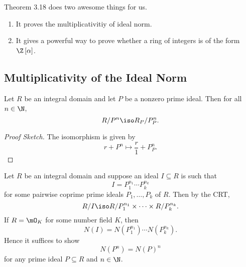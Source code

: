 \documentclass[pmath441]{subfiles}
\begin{document}
    \np Theorem 3.18 does two awesome things for us.
    \begin{enumerate}
        \item It proves the multiplicativitiy of ideal norm.
        \item It gives a powerful way to prove whether a ring of integers is of the form $\Z\left[ \alpha \right]$.
    \end{enumerate}
    
    \subsection{Multiplicativity of the Ideal Norm}
    
    \begin{prop}{}
        Let $R$ be an integral domain and let $P$ be a nonzero prime ideal. Then for all $n\in\N$,
        \begin{equation*}
            R /P^n \iso R_P /P_P^n.
        \end{equation*}
    \end{prop}

    \begin{proof}[Proof Sketch]
        The isomorphism is given by
        \begin{equation*}
            r+P^n \mapsto \frac{r}{1} + P_P^n.
        \end{equation*}
    \end{proof}

    \clearpage
    
    \begin{boxyrecall}{}
        Let $R$ be an integral domain and suppose an ideal $I\subseteq R$ is such that
        \begin{equation*}
            I = P_1^{n_1}\cdots P_k^{n_k}
        \end{equation*}
        for some pairwise coprime prime ideals $P_1,\ldots,P_k$ of $R$. Then by the CRT,
        \begin{equation*}
            R /I \iso R /P_1^{n_1}\times\cdots\times R /P_k^{n_k}.
        \end{equation*}
        If $R = \mO_K$ for some number field $K$, then
        \begin{equation*}
            N\left( I \right) = N\left( P_1^{n_1} \right)\cdots N\left( P_k^{n_k} \right).
        \end{equation*}
        Hence it suffices to show
        \begin{equation*}
            N\left( P^n \right) = N\left( P \right)^n
        \end{equation*}
        for any prime ideal $P\subseteq R$ and $n\in\N$.
    \end{boxyrecall}
    
\end{document}
